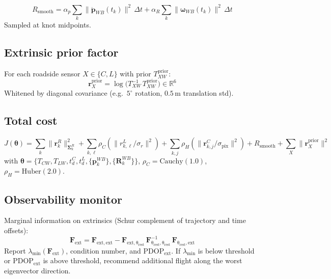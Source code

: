 \begin{equation}
  R_{\mathrm{smooth}} = \alpha_p \sum_k \|\ddot{\mathbf{p}}_{WB}(t_k)\|^2\,\Delta t + \alpha_R \sum_k \|\boldsymbol{\omega}_{WB}(t_k)\|^2\,\Delta t
\end{equation}
Sampled at knot midpoints.

\subsection{Extrinsic prior factor}
\label{sec:prior}

For each roadside sensor $X\in\{C,L\}$ with prior $T_{XW}^{\mathrm{prior}}$:
\begin{equation}
  \mathbf{r}_X^{\mathrm{prior}} = \log\!\bigl(T_{XW}^{-1}\,T_{XW}^{\mathrm{prior}}\bigr) \in \mathbb{R}^6
\end{equation}
Whitened by diagonal covariance (e.g.\ $5^\circ$ rotation, $0.5$\,m translation std).

\subsection{Total cost}
\label{sec:cost}

\begin{equation}
  J(\boldsymbol{\theta}) = \sum_k \|\mathbf{r}_k^R\|_{\boldsymbol{\Sigma}_k^R}^2
  + \sum_{k,\ell} \rho_C\!\left(\|r_{k,\ell}^L/\sigma_r\|^2\right)
  + \sum_{k,j} \rho_H\!\left(\|\mathbf{r}_{k,j}^C/\sigma_{\mathrm{pix}}\|^2\right)
  + R_{\mathrm{smooth}} + \sum_X \|\mathbf{r}_X^{\mathrm{prior}}\|^2
\end{equation}
with $\boldsymbol{\theta}=\{T_{CW},T_{LW},t_d^C,t_d^L,\{\mathbf{p}_k^{WB}\},\{\mathbf{R}_k^{WB}\}\}$, $\rho_C=\mathrm{Cauchy}(1.0)$, $\rho_H=\mathrm{Huber}(2.0)$.

\subsection{Observability monitor}
\label{sec:observability}

Marginal information on extrinsics (Schur complement of trajectory and time offsets):
\begin{equation}
  \mathbf{F}_{\mathrm{ext}} = \mathbf{F}_{\mathrm{ext,ext}} - \mathbf{F}_{\mathrm{ext,\theta_{\mathrm{rest}}}}\,\mathbf{F}_{\mathrm{\theta_{\mathrm{rest}},\theta_{\mathrm{rest}}}}^{-1}\,\mathbf{F}_{\mathrm{\theta_{\mathrm{rest}},\mathrm{ext}}}
\end{equation}
Report $\lambda_{\min}(\mathbf{F}_{\mathrm{ext}})$, condition number, and $\mathrm{PDOP}_{\mathrm{ext}}$.
If $\lambda_{\min}$ is below threshold or $\mathrm{PDOP}_{\mathrm{ext}}$ is above threshold, recommend additional flight along the worst eigenvector direction.

